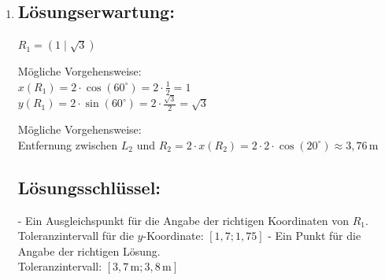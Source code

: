 \begin{langesbeispiel}
{\begin{enumerate}
Amplitude von $h\!:$ ca. 2,9 nach ca. 0,2\,ms

Mögliche Begründung:\\
Die Amplitude von $h$ ist nicht gleich der Summe der Amplituden von $h_1, h_2$ und $h_3$, da die drei Funktionen ihre maximlen Funktionswerte zu unterschiedlichen Zeitpunkten erreichen.


\subsection{Lösungsschlüssel:}
- Ein Punkt für die Angabe der richtigen Amplitude und den richtigen Zeitpunkt, wobei die Einheit "`ms"' nicht angeführt sein muss.\\
Toleranzintervalle: $[2,85; 2,95]$ bzw. $[0,19\,\text{ms}; 0,21\,\text{ms}]$
- Ein Punkt für eine korrekte Begründung.

\item \subsection{Lösungserwartung:}

$R_1=(1\mid\sqrt{3})$

Mögliche Vorgehensweise:\\
$x(R_1)=2\cdot\cos(60^\circ)=2\cdot\frac{1}{2}=1$\\
$y(R_1)=2\cdot\sin(60^\circ)=2\cdot\frac{\sqrt{3}}{2}=\sqrt{3}$

Mögliche Vorgehensweise:\\
Entfernung zwischen $L_2$ und $R_2=2\cdot x(R_2)=2\cdot 2\cdot\cos(20^\circ)\approx 3,76$\,m

\subsection{Lösungsschlüssel:}
- Ein Ausgleichspunkt für die Angabe der richtigen Koordinaten von $R_1$.\\
Toleranzintervall für die $y$-Koordinate: $[1,7; 1,75]$
- Ein Punkt für die Angabe der richtigen Lösung.\\
Toleranzintervall: $[3,7\,\text{m}; 3,8\,\text{m}]$

\end{enumerate}}
\end{langesbeispiel}